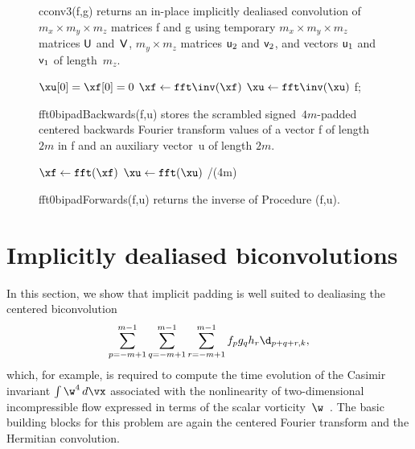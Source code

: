 \documentclass[final]{siamltex}
\begin{document}
\begin{figure}[htbp]
\begin{minipage}{0.55\linewidth}
\begin{function}[H]
  \Return \xf\;
\caption{cconv3({\sf f},{\sf g}) 
returns an in-place implicitly dealiased convolution of
\hbox{$m_x\times m_y\times m_z$} matrices {\sf f} and {\sf g} using temporary
\hbox{$m_x\times m_y\times m_z$} matrices ${\sf U}$ and~${\sf V}$, 
$m_y\times m_z$ matrices ${\sf u}_2$ and ${\sf v}_2$,
and vectors ${\sf u}_1$ and ${\sf v}_1$ of length~$m_z$.}\label{cconv3}
\end{function}
\end{minipage}
%
\begin{minipage}{0.46\linewidth}
\begin{procedure}[H]
  $\xu[0]=\xf[0]=0$\;
  $\xf \leftarrow \fft\inv(\xf)$\;
  $\xu \leftarrow \fft\inv(\xu)$\;
  \Return f;
  \caption{fft0bipadBackwards({\sf f},{\sf u}) stores the 
scrambled signed~$4m$-padded centered backwards Fourier transform values of a
vector {\sf f} of length~$2m$ in {\sf f} and an auxiliary vector~{\sf u} of
length $2m$.}\label{fft0bipadBackwards}
\end{procedure}
\begin{function}[H]
  $\xf \leftarrow \fft(\xf)$\;
  $\xu \leftarrow \fft(\xu)$\;
  \Return \xf/(4m)\;
  \caption{fft0bipadForwards({\sf f},{\sf u}) returns the
inverse of Procedure \fftObipadBackwards({\sf f},{\sf u}).}
\label{fft0bipadForwards}
\end{function}
\end{minipage}
\end{figure}

\section{Implicitly dealiased biconvolutions}\label{hyperconv}
In this section, we show that implicit padding is well suited to
dealiasing the centered biconvolution
$$
\sum_{p=-m+1}^{m-1}\sum_{q=-m+1}^{m-1}\sum_{r=-m+1}^{m-1} f_p g_q h_r\d_{p+q+r,k},
$$
which, for example, is required to compute the time evolution of the
Casimir invariant $\int \w^4\,d\vx$ associated with the nonlinearity of
two-dimensional incompressible flow expressed in terms of the scalar
vorticity~$\w$~\cite{Bowman10}. The basic building blocks for this problem
are again the centered Fourier transform and the Hermitian convolution.
\end{document}
